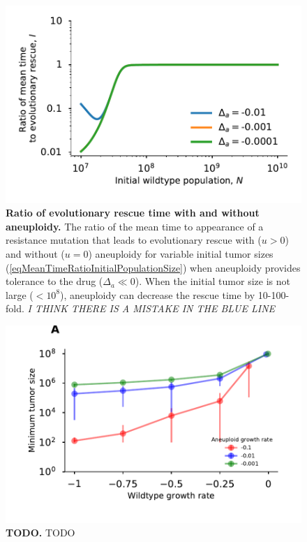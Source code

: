 \documentclass[12pt]{extarticle}
\begin{document}

\begin{figure}
 \vspace*{1\baselineskip}
\includegraphics[width=1\textwidth]{Figures/MeanTimeRatioInitialPopulationSize.pdf}
\caption{\textbf{Ratio of evolutionary rescue time with and without aneuploidy.}
The ratio of the mean time to appearance of a resistance mutation that leads to evolutionary rescue with ($u>0$) and without ($u=0$) aneuploidy for variable initial tumor sizes (\cref{eqMeanTimeRatioInitialPopulationSize}) when aneuploidy provides tolerance to the drug ($\Delta_a\ll0$). When the initial tumor size is not large ($<10^8$), aneuploidy can decrease the rescue time by 10-100-fold.
\emph{I THINK THERE IS A MISTAKE IN THE BLUE LINE} %
}
\label{MeanTimeRatioInitialPopulationSize}
\end{figure}


\begin{figure}
 \vspace*{1\baselineskip}
\includegraphics[width=1\textwidth]{Figures/ThresholdPopulationSize.pdf}
\caption{\textbf{TODO.}
TODO
}
\label{MeanTimeRatioInitialPopulationSize}
\end{figure}
\end{document}
